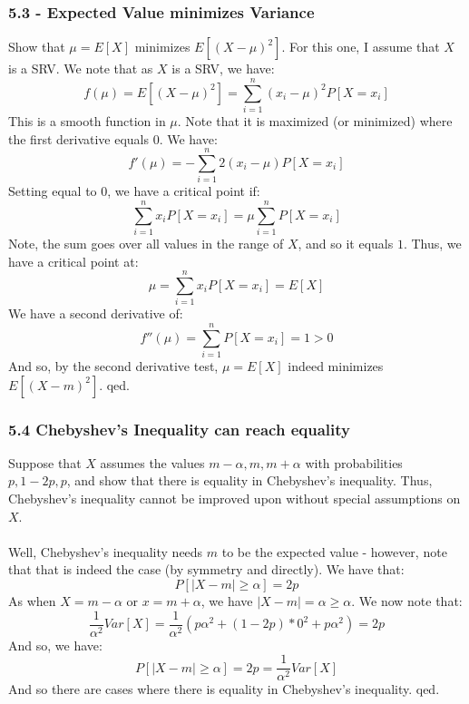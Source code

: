 \documentclass[12pt,a4paper]{article}
\newcommand{\1}[1]{\mathbbm{1}\left\{ #1 \right\}}
\begin{document}
\subsubsection{5.3 - Expected Value minimizes Variance} Show that $\mu = E[X]$ minimizes $E[(X-\mu)^2]$. For this one, I assume that $X$ is a SRV. We note that as $X$ is a SRV, we have:
$$
	f(\mu) = E[(X-\mu)^2] = \sum_{i=1}^n (x_i - \mu)^2P[X = x_i]
$$
This is a smooth function in $\mu$. Note that it is maximized (or minimized) where the first derivative equals $0$. We have:
$$
	f'(\mu) = -\sum_{i=1}^n 2(x_i - \mu)P[X = x_i]
$$
Setting equal to $0$, we have a critical point if:
$$
	\sum_{i=1}^n x_i P[X = x_i] = \mu \sum_{i=1}^n P[X = x_i]
$$
Note, the sum goes over all values in the range of $X$, and so it equals $1$. Thus, we have a critical point at:
$$
	\mu = \sum_{i=1}^n x_iP[X = x_i] = E[X]
$$
We have a second derivative of:
$$
	f''(\mu) = \sum_{i=1}^n P[X = x_i] = 1 > 0
$$
And so, by the second derivative test, $\mu = E[X]$ indeed minimizes $E[(X-m)^2]$. qed.

\subsubsection{5.4 Chebyshev's Inequality can reach equality} Suppose that $X$ assumes the values $m - \alpha, m, m + \alpha$ with probabilities $p, 1 - 2p, p$, and show that there is equality in Chebyshev's inequality. Thus, Chebyshev's inequality cannot be improved upon without special assumptions on $X$.
\\\\
Well, Chebyshev's inequality needs $m$ to be the expected value - however, note that that is indeed the case (by symmetry and directly). We have that:
$$
	P[|X - m| \geq \alpha] = 2p
$$
As when $X = m - \alpha$ or $x = m + \alpha$, we have $|X - m| = \alpha \geq \alpha$. We now note that:
$$
	\frac{1}{\alpha^2}Var[X] =
	\frac{1}{\alpha^2}\left(p \alpha^2 + (1 - 2p) * 0^2 + p \alpha^2\right) = 2p
$$
And so, we have:
$$
	P[|X - m| \geq \alpha] = 2p = \frac{1}{\alpha^2}Var[X]
$$
And so there are cases where there is equality in Chebyshev's inequality. qed.
\end{document}
